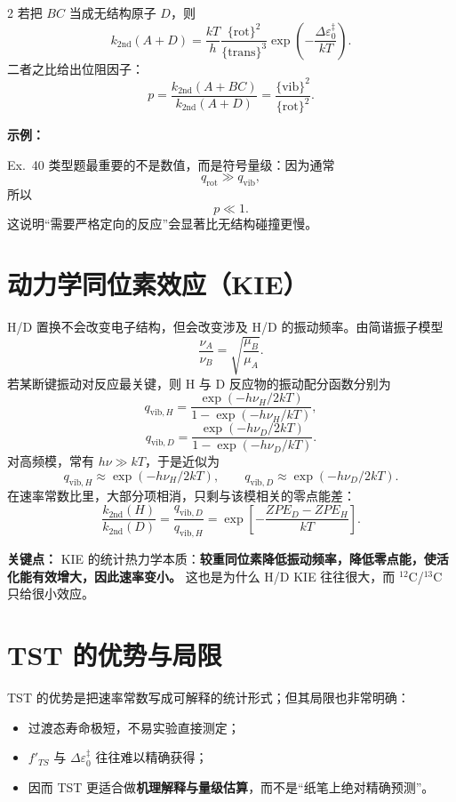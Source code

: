 \documentclass[a4paper,9pt]{article}
\newenvironment{keypoint}
{\par\vspace{0.3em}\noindent\begin{tcolorbox}[colback=keybg,colframe=keycolor,boxrule=0.5pt,arc=2pt,left=2pt,right=2pt,top=2pt,bottom=2pt,boxsep=0pt]\noindent\textcolor{keycolor}{\textbf{关键点：}}}
{\end{tcolorbox}\par\vspace{0.3em}}
\newenvironment{examplebox}
{\par\vspace{0.3em}\noindent\begin{tcolorbox}[colback=boxbg,colframe=derivcolor,boxrule=0.5pt,arc=2pt,left=2pt,right=2pt,top=2pt,bottom=2pt,boxsep=0pt]\scriptsize\noindent\textcolor{derivcolor}{\textbf{示例：}}\par\setlength{\parskip}{0.1ex}\setlength{\itemsep}{0pt}\setlength{\parsep}{0pt}}
{\end{tcolorbox}\par\vspace{0.3em}}
\begin{document}
\begin{multicols}{2}
若把 $BC$ 当成无结构原子 $D$，则
\[
k_{2\mathrm{nd}}(A+D)=\frac{kT}{h}
\frac{\{\mathrm{rot}\}^2}{\{\mathrm{trans}\}^3}
\exp\left(-\frac{\Delta\varepsilon_0^{\ddagger}}{kT}\right).
\]
二者之比给出位阻因子：
\[
p=\frac{k_{2\mathrm{nd}}(A+BC)}{k_{2\mathrm{nd}}(A+D)}
=\frac{\{\mathrm{vib}\}^2}{\{\mathrm{rot}\}^2}.
\]

\begin{examplebox}
Ex.~40 类型题最重要的不是数值，而是符号量级：因为通常
\[
q_{\mathrm{rot}}\gg q_{\mathrm{vib}},
\]
所以
\[
p\ll 1.
\]
这说明“需要严格定向的反应”会显著比无结构碰撞更慢。
\end{examplebox}

\section{动力学同位素效应（KIE）}

H/D 置换不会改变电子结构，但会改变涉及 H/D 的振动频率。由简谐振子模型
\[
\frac{\nu_A}{\nu_B}=\sqrt{\frac{\mu_B}{\mu_A}}.
\]
若某断键振动对反应最关键，则 H 与 D 反应物的振动配分函数分别为
\[
q_{\mathrm{vib},H}=\frac{\exp(-h\nu_H/2kT)}{1-\exp(-h\nu_H/kT)},
\]
\[
q_{\mathrm{vib},D}=\frac{\exp(-h\nu_D/2kT)}{1-\exp(-h\nu_D/kT)}.
\]
对高频模，常有 $h\nu\gg kT$，于是近似为
\[
q_{\mathrm{vib},H}\approx \exp(-h\nu_H/2kT),
\qquad
q_{\mathrm{vib},D}\approx \exp(-h\nu_D/2kT).
\]
在速率常数比里，大部分项相消，只剩与该模相关的零点能差：
\[
\frac{k_{2\mathrm{nd}}(H)}{k_{2\mathrm{nd}}(D)}
=\frac{q_{\mathrm{vib},D}}{q_{\mathrm{vib},H}}
=\exp\left[-\frac{ZPE_D-ZPE_H}{kT}\right].
\]

\begin{keypoint}
KIE 的统计热力学本质：\textbf{较重同位素降低振动频率，降低零点能，使活化能有效增大，因此速率变小。}
这也是为什么 H/D KIE 往往很大，而 $^{12}$C/$^{13}$C 只给很小效应。
\end{keypoint}

\section{TST 的优势与局限}

TST 的优势是把速率常数写成可解释的统计形式；但其局限也非常明确：
\begin{itemize}
  \item 过渡态寿命极短，不易实验直接测定；
  \item $f'_{TS}$ 与 $\Delta\varepsilon_0^{\ddagger}$ 往往难以精确获得；
  \item 因而 TST 更适合做\textbf{机理解释与量级估算}，而不是“纸笔上绝对精确预测”。
\end{itemize}


\end{multicols}
\end{document}
